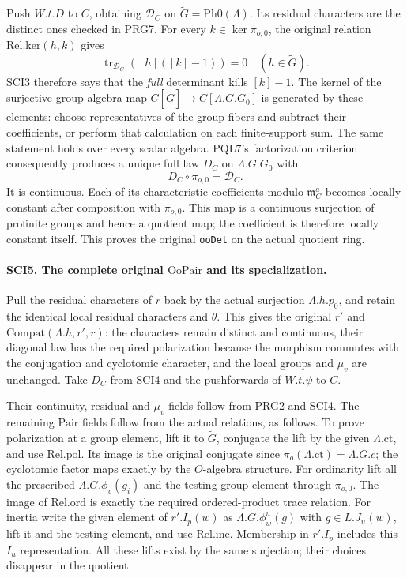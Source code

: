 Push \(W.t.D\) to \(C\), obtaining \(\mathcal D_C\) on
\(\widetilde G=\mathrm{Ph0}(\Lambda)\). Its residual characters are
the distinct ones checked in PRG7. For every
\(k\in\ker\pi_{o,0}\), the original relation
\(\mathrm{Rel.ker}(h,k)\) gives
\[
 \operatorname{tr}_{\mathcal D_C}([h]([k]-1))=0
       \quad(h\in\widetilde G).
\]
SCI3 therefore says that the \emph{full} determinant kills
\([k]-1\). The kernel of the surjective group-algebra map
\(C[\widetilde G]\to C[\Lambda.G.G_0]\) is generated by these elements:
choose representatives of the group fibers and subtract their
coefficients, or perform that calculation on each finite-support
sum. The same statement holds over every scalar algebra.
PQL7's factorization criterion consequently produces a unique
full law \(D_C\) on \(\Lambda.G.G_0\) with
\[
 D_C\circ\pi_{o,0}=\mathcal D_C.                          \tag{SCI.8}
\]
It is continuous. Each of its characteristic coefficients modulo
\(\mathfrak m_C^a\) becomes locally constant after composition
with \(\pi_{o,0}\). This map is a continuous surjection of
profinite groups and hence a quotient map; the coefficient is
therefore locally constant itself. This proves the original
\texttt{ooDet} on the actual quotient ring.

\paragraph{SCI5. The complete original \(\mathrm{OoPair}\) and its specialization.}
\label{claim:SCI5}
Pull the residual characters of \(r\) back by the actual
surjection \(\Lambda.h.p_0\), and retain the identical local
residual characters and \(\theta\). This gives the original
\(r'\) and \(\mathrm{Compat}(\Lambda.h,r',r)\): the characters
remain distinct and continuous, their diagonal law has the
required polarization because the morphism commutes with the
conjugation and cyclotomic character, and the local groups and
\(\mu_v\) are unchanged. Take \(D_C\) from SCI4 and the
pushforwards of \(W.t.\psi\) to \(C\).

Their continuity, residual and \(\mu_v\) fields follow from
PRG2 and SCI4. The remaining \(\mathrm{Pair}\) fields follow
from the actual relations, as follows. To prove polarization at
a group element, lift it to \(\widetilde G\), conjugate the lift by the
given \(\Lambda.\mathrm{ct}\), and use \(\mathrm{Rel.pol}\).
Its image is the original conjugate since
\(\pi_o(\Lambda.\mathrm{ct})=\Lambda.G.c\); the cyclotomic
factor maps exactly by the \(O\)-algebra structure. For
ordinarity lift all the prescribed \(\Lambda.G.\phi_v(g_i)\)
and the testing group element through \(\pi_{o,0}\).
The image of \(\mathrm{Rel.ord}\) is exactly the required
ordered-product trace relation. For inertia write the given
element of \(r'.I_p(w)\) as \(\Lambda.G.\phi^u_w(g)\)
with \(g\in L.J_u(w)\), lift it and the testing element,
and use \(\mathrm{Rel.ine}\). Membership in \(r'.I_p\)
includes this \(I_u\) representation. All these lifts exist
by the same surjection; their choices disappear in the quotient.

